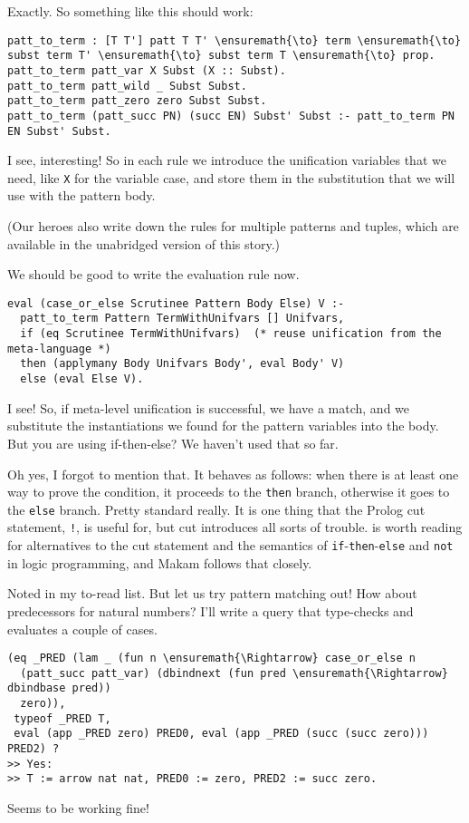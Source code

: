 \heroADVISOR{} Exactly. So something like this should work:

\begin{verbatim}
patt_to_term : [T T'] patt T T' \ensuremath{\to} term \ensuremath{\to} subst term T' \ensuremath{\to} subst term T \ensuremath{\to} prop.
patt_to_term patt_var X Subst (X :: Subst).
patt_to_term patt_wild _ Subst Subst.
patt_to_term patt_zero zero Subst Subst.
patt_to_term (patt_succ PN) (succ EN) Subst' Subst :- patt_to_term PN EN Subst' Subst.
\end{verbatim}

\heroSTUDENT{} I see, interesting! So in each rule we introduce the
unification variables that we need, like \texttt{X} for the variable
case, and store them in the substitution that we will use with the
pattern body.

\begin{scenecomment}
(Our heroes also write down the rules for multiple patterns and tuples, which are
available in the unabridged version of this story.)
\end{scenecomment}

\heroADVISOR{} We should be good to write the evaluation rule now.

\begin{verbatim}
eval (case_or_else Scrutinee Pattern Body Else) V :-
  patt_to_term Pattern TermWithUnifvars [] Unifvars,
  if (eq Scrutinee TermWithUnifvars)  (* reuse unification from the meta-language *)
  then (applymany Body Unifvars Body', eval Body' V)
  else (eval Else V).
\end{verbatim}

\heroSTUDENT{} I see! So, if meta-level unification is successful, we have a
match, and we substitute the instantiations we found for the pattern
variables into the body. But you are using if-then-else? We haven't used
that so far.

\heroADVISOR{} Oh yes, I forgot to mention that. It behaves as follows: when
there is at least one way to prove the condition, it proceeds to the
\texttt{then} branch, otherwise it goes to the \texttt{else} branch.
Pretty standard really. It is one thing that the Prolog cut statement,
\texttt{!}, is useful for, but cut introduces all sorts of trouble.
\citet{kiselyov05backtracking} is worth reading for alternatives to the
cut statement and the semantics of
\texttt{if}-\texttt{then}-\texttt{else} and \texttt{not} in logic
programming, and Makam follows that closely.

\heroSTUDENT{} Noted in my to-read list. But let us try pattern matching out!
How about predecessors for natural numbers? I'll write a query that
type-checks and evaluates a couple of cases.

\begin{verbatim}
(eq _PRED (lam _ (fun n \ensuremath{\Rightarrow} case_or_else n
  (patt_succ patt_var) (dbindnext (fun pred \ensuremath{\Rightarrow} dbindbase pred))
  zero)),
 typeof _PRED T,
 eval (app _PRED zero) PRED0, eval (app _PRED (succ (succ zero))) PRED2) ?
>> Yes:
>> T := arrow nat nat, PRED0 := zero, PRED2 := succ zero.
\end{verbatim}

\heroADVISOR{} Seems to be working fine!
